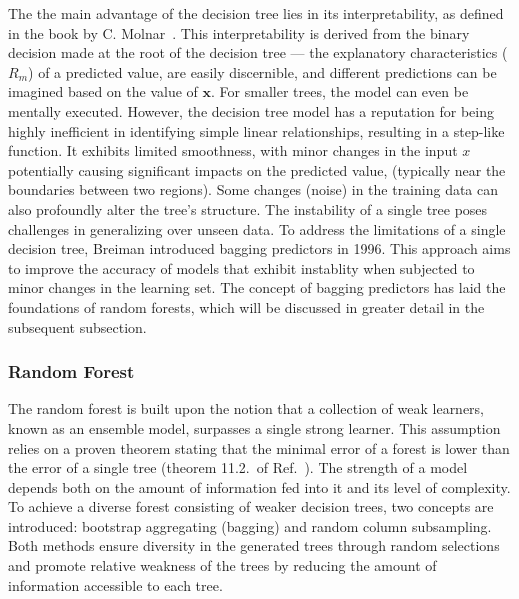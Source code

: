 \documentclass[main]{subfiles}
\begin{document}
The the main advantage of the decision tree lies in its interpretability, as defined in the book by C. Molnar~\cite{molnar2020interpretable}. This interpretability is derived from the binary decision made at the root of the decision tree --- the explanatory characteristics ($R_m$) of a predicted value, are easily discernible, and different predictions can be imagined based on the value of $\mathbf{x}$. For smaller trees, the model can even be mentally executed. However, the decision tree model has a reputation for being highly inefficient in identifying simple linear relationships, resulting in a step-like function. It exhibits limited smoothness, with minor changes in the input $x$ potentially causing significant impacts on the predicted value, (typically near the boundaries between two regions). Some changes (noise) in the training data can also profoundly alter the tree's structure. The instability of a single tree poses challenges in generalizing over unseen data.\autocite{molnar2020interpretable} To address the limitations of a single decision tree, Breiman introduced bagging predictors in 1996. This approach aims to improve the accuracy of models that exhibit instablity when subjected to minor changes in the learning set.\autocite{Breiman_1996} The concept of bagging predictors has laid the foundations of random forests, which will be discussed in greater detail in the subsequent subsection.

\subsubsection{Random Forest}

The random forest is built upon the notion that a collection of weak learners, known as an ensemble model, surpasses a single strong learner. This assumption relies on a proven theorem stating that the minimal error of a forest is lower than the error of a single tree (theorem 11.2.\ of Ref.~\cite{Breiman_2001}). The strength of a model depends both on the amount of information fed into it and its level of complexity. To achieve a diverse forest consisting of weaker decision trees, two concepts are introduced: bootstrap aggregating (bagging) and random column subsampling. Both methods ensure diversity in the generated trees through random selections and promote relative weakness of the trees by reducing the amount of information accessible to each tree.
\end{document}
